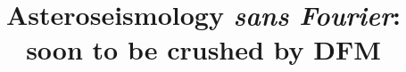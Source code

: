 \documentclass[modern]{aastex61}
\begin{document}
\sloppy\sloppypar\raggedbottom\frenchspacing %

\title{Asteroseismology {\it sans Fourier}: soon to be crushed by DFM}


\end{document}
